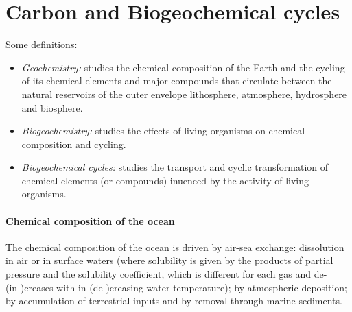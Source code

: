 \section{Carbon and Biogeochemical cycles} 
Some definitions: 
\begin{itemize}
    \item \textit{Geochemistry:} studies the chemical composition of the Earth and the cycling of its chemical elements and major compounds that circulate between the natural reservoirs of the outer envelope lithosphere, atmosphere, hydrosphere and biosphere.  
    \item \textit{Biogeochemistry: } studies the effects of living organisms on chemical composition and cycling. 
    \item \textit{Biogeochemical cycles:} studies the transport and cyclic transformation of chemical elements (or compounds) inuenced by the activity of living organisms. 
\end{itemize}
\paragraph{Chemical composition of the ocean} The chemical composition of the ocean is driven by air-sea exchange: dissolution in air or in surface waters (where solubility is given by the products of partial pressure and the solubility coefficient, which is different for each gas and de-(in-)creases with in-(de-)creasing water temperature); by atmospheric deposition; by accumulation of terrestrial inputs and by removal through marine sediments. 

